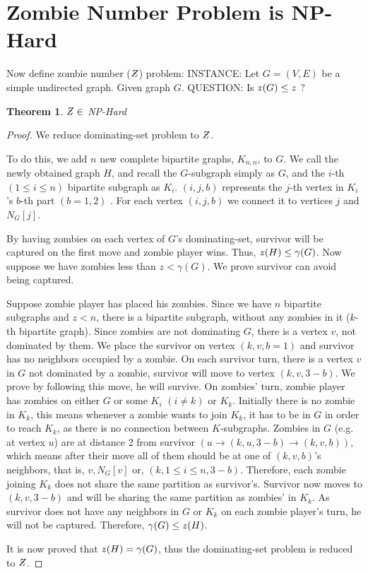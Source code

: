 \documentclass[1p]{elsarticle}
\newtheorem{theorem}{Theorem}
\newcommand{\NPZ}{\ooalign{$Z$\cr\hfil\rule[.8ex]{.3em}{.09ex}\hfil\cr}}
\newcommand{\zn}{\ooalign{$z$\cr\hfil\rule[.5ex]{.2em}{.08ex}\hfil\cr}}
\begin{document}
	
	\section{Zombie Number Problem is NP-Hard}\label{np-zombienumber}

	Now define zombie number ($\NPZ$) problem:
	{\newline}
	INSTANCE: Let $G = (V,E)$ be a simple undirected graph. Given graph $G$.
	{\newline}
	QUESTION: Is $\zn (G) \leq z$ ?

	\begin{theorem}
		$\NPZ \in$ NP-Hard
	\end{theorem}
	\begin{proof}
		We reduce dominating-set problem to $\NPZ$.

		To do this, we add $n$ new complete bipartite graphs, $K_{n,n}$, to $G$. We call the newly obtained graph $H$,
		and recall the $G$-subgraph simply as $G$, and the $i$-th $(1 \leq i \leq n)$ bipartite subgraph as $K_i$.
		$(i,j,b)$ represents the $j$-th vertex in $K_i$'s $b$-th part $(b = 1,2)$ . For each vertex $(i,j,b)$ we connect
		it to vertices $j$ and $N_G[j]$.

		By having zombies on each vertex of $G$'s dominating-set, survivor will be captured on the first move and zombie
		player wins. Thus, $\zn(H) \leq \gamma(G)$. Now suppose we have zombies less than $z < \gamma(G)$. We prove
		survivor can avoid being captured.

		Suppose zombie player has placed his zombies. Since we have $n$ bipartite subgraphs and $z < n$, there is a
		bipartite subgraph, without any zombies in it ($k$-th bipartite graph). Since zombies are not dominating $G$,
		there is a vertex $v$, not dominated by them. We place the survivor on vertex $(k,v,b = 1)$ and survivor has no
		neighbors occupied by a zombie. On each survivor turn, there is a vertex $v$ in $G$ not dominated by a zombie,
		survivor will move to vertex $(k,v,3 - b)$. We prove by following this move, he will survive. On zombies' turn,
		zombie player has zombies on either $G$ or some $K_i$ $(i \neq k)$ or $K_k$. Initially there is no zombie in
		$K_k$, this means whenever a zombie wants to join $K_k$, it has to be in $G$ in order to reach $K_k$, as there
		is no connection between $K$-subgraphs. Zombies in $G$ (e.g. at vertex $u$) are at distance 2 from survivor $(u
		\rightarrow (k,u,3 - b) \rightarrow (k,v,b))$, which means after their move all of them should be at one of
		$(k,v,b)$'s neighbors, that is, $v , N_G[v] $ or, $ (k,1 \leq i \leq n,3 - b)$. Therefore, each zombie joining
		$K_k$ does not share the same partition as survivor's. Survivor now moves to $(k,v,3-b)$ and will be sharing the
		same partition as zombies' in $K_k$. As survivor does not have any neighbors in $G$ or $K_k$ on each zombie
		player's turn, he will not be captured. Therefore, $\gamma(G) \leq \zn(H)$.

		It is now proved that $\zn(H) = \gamma(G)$, thus the dominating-set problem is reduced to $\NPZ$.

	\end{proof}
\end{document}
